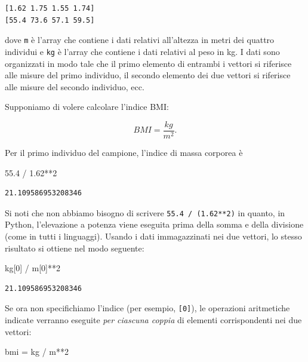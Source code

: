 \documentclass[
  letterpaper,
  krantz2]{{[}./krantz{]}}
\newenvironment{Shaded}{\begin{snugshade}}{\end{snugshade}}
\newcommand{\DecValTok}[1]{\textcolor[rgb]{0.68,0.00,0.00}{#1}}
\newcommand{\FloatTok}[1]{\textcolor[rgb]{0.68,0.00,0.00}{#1}}
\newcommand{\NormalTok}[1]{\textcolor[rgb]{0.00,0.23,0.31}{#1}}
\newcommand{\OperatorTok}[1]{\textcolor[rgb]{0.37,0.37,0.37}{#1}}
\begin{document}
\begin{verbatim}
[1.62 1.75 1.55 1.74]
[55.4 73.6 57.1 59.5]
\end{verbatim}

dove \texttt{m} è l'array che contiene i dati relativi all'altezza in
metri dei quattro individui e \texttt{kg} è l'array che contiene i dati
relativi al peso in kg. I dati sono organizzati in modo tale che il
primo elemento di entrambi i vettori si riferisce alle misure del primo
individuo, il secondo elemento dei due vettori si riferisce alle misure
del secondo individuo, ecc.

Supponiamo di volere calcolare l'indice BMI:

\[
BMI = \frac{kg}{m^2}.
\]

Per il primo individuo del campione, l'indice di massa corporea è

\begin{Shaded}
\begin{Highlighting}[]
\FloatTok{55.4} \OperatorTok{/} \FloatTok{1.62}\OperatorTok{**}\DecValTok{2}
\end{Highlighting}
\end{Shaded}

\begin{verbatim}
21.109586953208346
\end{verbatim}

Si noti che non abbiamo bisogno di scrivere \texttt{55.4\ /\ (1.62**2)}
in quanto, in Python, l'elevazione a potenza viene eseguita prima della
somma e della divisione (come in tutti i linguaggi). Usando i dati
immagazzinati nei due vettori, lo stesso risultato si ottiene nel modo
seguente:

\begin{Shaded}
\begin{Highlighting}[]
\NormalTok{kg[}\DecValTok{0}\NormalTok{] }\OperatorTok{/}\NormalTok{ m[}\DecValTok{0}\NormalTok{]}\OperatorTok{**}\DecValTok{2}
\end{Highlighting}
\end{Shaded}

\begin{verbatim}
21.109586953208346
\end{verbatim}

Se ora non specifichiamo l'indice (per esempio, \texttt{{[}0{]}}), le
operazioni aritmetiche indicate verranno eseguite \emph{per ciascuna
coppia} di elementi corrispondenti nei due vettori:

\begin{Shaded}
\begin{Highlighting}[]
\NormalTok{bmi }\OperatorTok{=}\NormalTok{ kg }\OperatorTok{/}\NormalTok{ m}\OperatorTok{**}\DecValTok{2}
\end{Highlighting}
\end{Shaded}
\end{document}
